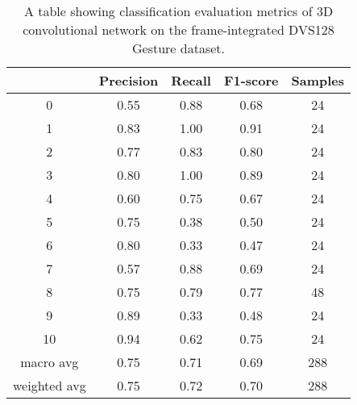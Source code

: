\begin{table}[htb]
    \centering
    \begin{tabular}{|| c | c | c | c | c ||}
        \hline
            & Precision & Recall & F1-score & Samples \\
        \hline
        \hline
        0            & 0.55 & 0.88 & 0.68 & 24  \\
        \hline
        1            & 0.83 & 1.00 & 0.91 & 24  \\
        \hline
        2            & 0.77 & 0.83 & 0.80 & 24  \\
        \hline
        3            & 0.80 & 1.00 & 0.89 & 24  \\
        \hline
        4            & 0.60 & 0.75 & 0.67 & 24  \\
        \hline
        5            & 0.75 & 0.38 & 0.50 & 24  \\
        \hline
        6            & 0.80 & 0.33 & 0.47 & 24  \\
        \hline
        7            & 0.57 & 0.88 & 0.69 & 24  \\
        \hline
        8            & 0.75 & 0.79 & 0.77 & 48  \\
        \hline
        9            & 0.89 & 0.33 & 0.48 & 24  \\
        \hline
        10           & 0.94 & 0.62 & 0.75 & 24  \\
        \hline
        macro avg    & 0.75 & 0.71 & 0.69 & 288 \\
        \hline
        weighted avg & 0.75 & 0.72 & 0.70 & 288 \\
        \hline
    \end{tabular}
    \caption{A table showing classification evaluation metrics of 3D convolutional network on the frame-integrated DVS128 Gesture dataset.}
    \label{tab:conv3d_dvs128_evaluation_metrics}
\end{table}

